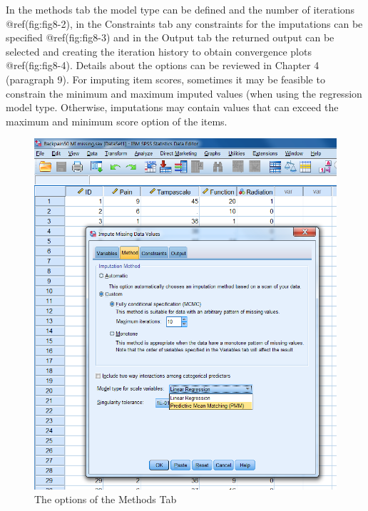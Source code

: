 \documentclass[
]{book}
\begin{document}
In the methods tab the model type can be defined and the number of
iterations @ref(fig:fig8-2), in the Constraints tab any constraints for
the imputations can be specified @ref(fig:fig8-3) and in the Output tab
the returned output can be selected and creating the iteration history
to obtain convergence plots @ref(fig:fig8-4). Details about the options
can be reviewed in Chapter 4 (paragraph 9). For imputing item scores,
sometimes it may be feasible to constrain the minimum and maximum
imputed values (when using the regression model type. Otherwise,
imputations may contain values that can exceed the maximum and minimum
score option of the items.

\begin{figure}

{\centering \includegraphics[width=0.9\linewidth]{images/fig8.2} 

}

\caption{The options of the Methods Tab}\label{fig:fig8-2}
\end{figure}
\end{document}
